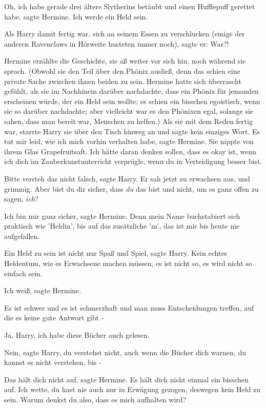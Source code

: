 \glqq{}Oh, ich habe gerade drei ältere Slytherins betäubt und einen Hufflepuff
gerettet habe\grqq{}, sagte Hermine. \glqq{}Ich werde ein Held sein.\grqq{}

Als Harry damit fertig war, sich an seinem Essen zu verschlucken (einige der
anderen Ravenclaws in Hörweite husteten immer noch), sagte er: \glqq{}
Was?!\grqq{}

Hermine erzählte die Geschichte, sie aß weiter vor sich hin, noch während sie
sprach. (Obwohl sie den Teil über den Phönix ausließ, denn das schien eine
private Sache zwischen ihnen beiden zu sein. Hermine hatte sich überrascht
gefühlt, als sie im Nachhinein darüber nachdachte, dass ein Phönix für jemanden
erscheinen würde, der ein Held sein wollte; es schien ein bisschen egoistisch,
wenn sie so darüber nachdachte; aber vielleicht war es den Phönixen egal,
solange sie sahen, dass man bereit war, Menschen zu helfen.) Als sie mit dem
Reden fertig war, starrte Harry sie über den Tisch hinweg an und sagte kein
einziges Wort. \glqq{}Es tut mir leid, wie ich mich vorhin verhalten habe\grqq{},
sagte Hermine. Sie nippte von ihrem Glas Grapefruitsaft. \glqq{}Ich hätte daran
denken sollen, dass es okay ist, wenn ich dich im Zauberkunstunterricht
verprügle, wenn du in Verteidigung besser bist.\grqq{}

\glqq{}Bitte versteh das nicht falsch\grqq{}, sagte Harry. Er sah jetzt zu
erwachsen aus, und grimmig. \glqq{}Aber bist du dir sicher, dass \emph{du} das
bist und nicht, um es ganz offen zu sagen, \emph{ich}?\grqq{}

\glqq{}Ich bin mir ganz sicher\grqq{}, sagte Hermine. \glqq{}Denn mein Name
buchstabiert sich praktisch wie 'Heldin', bis auf das zusätzliche 'm', das ist
mir bis heute nie aufgefallen.\grqq{}

\glqq{}Ein Held zu sein ist nicht nur Spaß und Spiel\grqq{}, sagte Harry. \glqq{}
Kein echtes Heldentum, wie es Erwachsene machen müssen, es ist nicht so, es wird
nicht so einfach sein.\grqq{}

\glqq{}Ich weiß\grqq{}, sagte Hermine.

\glqq{}Es ist schwer und es ist schmerzhaft und man muss Entscheidungen treffen,
auf die es keine gute Antwort gibt -\grqq{}

\glqq{}Ja, Harry, ich habe diese Bücher auch gelesen.\grqq{}

\glqq{}Nein\grqq{}, sagte Harry, \glqq{}du verstehst nicht, auch wenn die Bücher
dich warnen, du kannst es nicht verstehen, bis -\grqq{}

\glqq{}Das hält dich nicht auf\grqq{}, sagte Hermine. \glqq{}Es hält dich nicht
einmal ein bisschen auf. Ich wette, du hast nie auch nur in Erwägung gezogen,
deswegen kein Held zu sein. Warum denkst du also, dass es mich aufhalten
wird?\grqq{}

